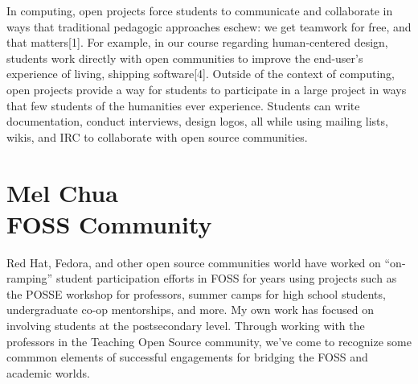 \documentclass{sig-alternate}
\begin{document}
In computing, open projects force students to communicate and collaborate in ways that traditional pedagogic approaches eschew: we get teamwork for free, and that matters[1]. %
For example, in our course regarding human-centered design, students work directly with open communities to improve the end-user's experience of living, shipping software[4]. %
Outside of the context of computing, open projects provide a way for students to participate in a large project in ways that few students of the humanities ever experience. %
Students can write documentation, conduct interviews, design logos, all while using mailing lists, wikis, and IRC to collaborate with %
open source communities. %


\begin{comment}
* [1] [[BegelBibTexChooseOne|Begel BibTeX]]
* [2] http://rockalypse.org/blogs/flyinggator/
* [3] http://concurrency.cc/book/
* [4] http://rockalypse.org/courses/cmpsc303f10/
* [5] http://fedoraproject.org/wiki/Allegheny_Activism_And_Fedora
* [6] http://rockalypse.org/courses/fs101f10/
* [7] [[LPPBibTeX|Lave & Wenger BibTeX]]
\end{comment}

\section{Mel Chua\\FOSS Community}

Red Hat, Fedora, and other open source communities world have worked on ``on-ramping'' student participation efforts in FOSS for years using projects such as the POSSE workshop for professors, summer camps for high school students, undergraduate co-op mentorships, and more.  My own work has focused on involving students at the postsecondary level.  Through working with the professors in the Teaching Open Source community, we've come to recognize some commmon elements of successful engagements for bridging the FOSS and academic worlds.
\end{document}
